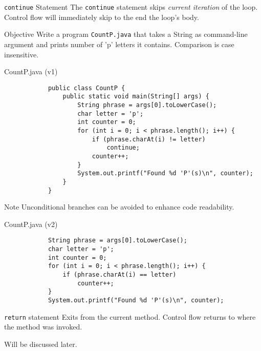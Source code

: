 \documentclass[10pt, compress]{beamer}
\begin{document}
\begin{slide}
	\begin{block}{\texttt{continue} Statement}
		The \texttt{continue} statement skips \emph{current iteration} of the loop.
		Control flow will immediately skip to the end the loop's body.
	\end{block}
\end{slide}

\begin{slide}
	\begin{block}{Objective}
		Write a program \texttt{CountP.java} that takes a String as command-line argument and prints number of 'p' letters it contains. Comparison is case insensitive.
	\end{block}
\end{slide}

\begin{slide}
	\begin{block}{CountP.java (v1)}
		\begin{verbatim}
			public class CountP {
			    public static void main(String[] args) {
			        String phrase = args[0].toLowerCase();
			        char letter = 'p';
			        int counter = 0;
			        for (int i = 0; i < phrase.length(); i++) {
			            if (phrase.charAt(i) != letter)
			                continue;
			            counter++;
			        }
			        System.out.printf("Found %d 'P'(s)\n", counter);
			    }
			}
		\end{verbatim}
	\end{block}
\end{slide}

\begin{slide}
	\begin{block}{Note}
	Unconditional branches can be avoided to enhance code readability.
	\end{block}
	\begin{block}{CountP.java (v2)}
		\begin{verbatim}
			String phrase = args[0].toLowerCase();
			char letter = 'p';
			int counter = 0;
			for (int i = 0; i < phrase.length(); i++) {
			    if (phrase.charAt(i) == letter)
			        counter++;
			}
			System.out.printf("Found %d 'P'(s)\n", counter);
		\end{verbatim}
	\end{block}
\end{slide}

\begin{slide}
	\begin{block}{\texttt{return} statement}
	Exits from the current method. Control flow returns to where the method was invoked.

	Will be discussed later.
	\end{block}
\end{slide}

\end{document}
